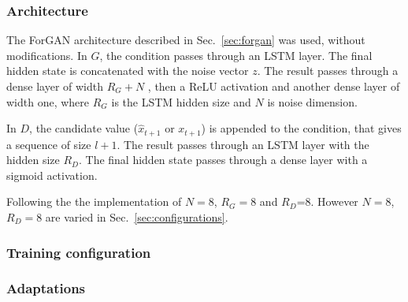 \subsubsection{Architecture}
The ForGAN architecture described in Sec.~\ref{sec:forgan} was used, without modifications. In $G$, the condition passes through an LSTM layer. The final hidden state is concatenated with the noise vector $z$. The result passes through a dense layer of width $R_G+N$ , then a ReLU activation and another dense layer of width one, where $R_G$ is the  LSTM hidden size and $N$ is noise dimension.

In $D$, the candidate value ($\hat{x}_{t+1}$ or $x_{t+1}$) is appended to the condition, that gives a sequence of size $l+1$. The result passes through an LSTM layer with the hidden size $R_D$. The final hidden state passes through a dense layer with a sigmoid activation.

Following the the implementation of \textcite{vuleticFinGANForecastingClassifying2024} $N=8$, $R_G=8$ and $R_D$=8. However $N=8$, $R_D=8$ are varied in Sec.~\ref{sec:configurations}.



\subsubsection{Training configuration}

\subsubsection{Adaptations}

